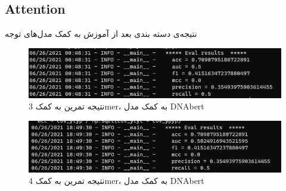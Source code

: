 \documentclass[12pt,a4paper,BCOR=.7cm,headsepline,bibliography=totoc]{report}
\begin{document}
\subsection{Attention}
نتیجه‌ی دسته بندی بعد از آموزش به کمک مدل‌های توجه
\begin{figure}[H]
\centering
\includegraphics[width=15cm, ]{pictures/3mer.jpg}
\caption{
نتیجه تمرین به کمک 3mer، به کمک مدل DNAbert
}\label{wrap-fig:4}
\end{figure}

\begin{figure}[H]
\centering
\includegraphics[width=15cm, ]{pictures/4mer.jpg}
\caption{
نتیجه تمرین به کمک 4mer، به کمک مدل DNAbert
}\label{wrap-fig:4}
\end{figure}
\end{document}

